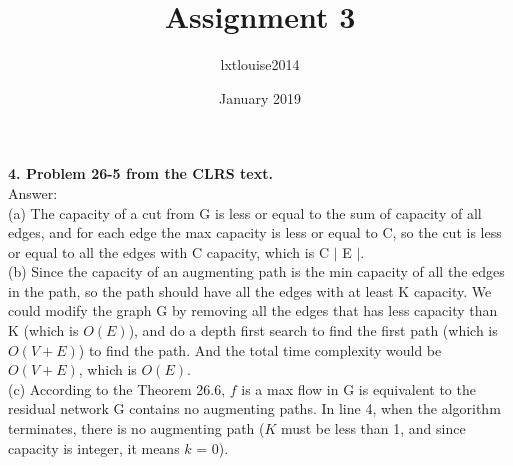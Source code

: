 \documentclass{article}
\title{Assignment 3}
\author{lxtlouise2014 }
\date{January 2019}
\begin{document}
\maketitle
\textbf{4. Problem 26-5 from the CLRS text.} \\
\noindent
Answer: \\
(a) The capacity of a cut from G is less or equal to the sum of capacity of all edges, and for each edge the max capacity is less or equal to C, so the cut is less or equal to all the edges with C capacity, which is C $|$ E $|$.\\
\newline
(b) Since the capacity of an augmenting path is the min capacity of all the edges in the path, so the path should have all the edges with at least K capacity. We could modify the graph G by removing all the edges that has less capacity than K (which is $O(E)$), and do a depth first search to find the first path (which is $O(V+E)$) to find the path. And the total time complexity would be $O(V+E)$, which is $O(E)$.  \\
\newline
(c) According to the Theorem 26.6, $f$ is a max flow in G is equivalent to the residual network G contains no augmenting paths. In line 4, when the algorithm terminates, there is no augmenting path ($K$ must be less than 1, and since capacity is integer, it means $k$ = 0).
\newline
\end{document}
